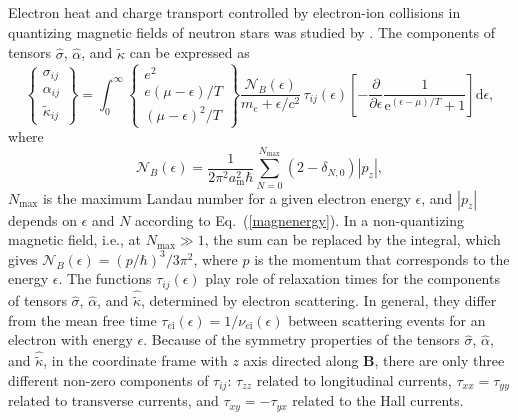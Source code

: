 \documentclass[smallextended]{svjour3}       %
\newcommand{\Ne}{\mathcal{N}_B(\epsilon)}
\newcommand{\req}[1]{Eq.~(\ref{#1})}
\begin{document}
Electron heat and charge transport controlled by electron-ion collisions in quantizing
magnetic fields of neutron stars was studied by
\citet{KaminkerYakovlev81,Yakovlev84,Hernquist84,P96,P99}.
The components of tensors $\hat{\sigma}$, $\hat{\alpha}$, and
$\hat{\tilde\kappa}$ can
be expressed as \citep{P99}
\begin{equation}
\left\{
   \begin{array}{c}
       \sigma_{ij} \\ \alpha_{ij} \\ \tilde\kappa_{ij}
   \end{array}
   \right\}
  =
     \int_{0}^\infty \left\{
   \begin{array}{c}
       e^2 \\ e {(\mu - \epsilon)/ T} \\ {(\mu - \epsilon)^2/ T}
   \end{array}
   \right\}
   \frac{\Ne}{m_e+\epsilon/c^2} \,\tau_{ij}(\epsilon)
   \left[ -\frac{\partial}{\partial\epsilon}
        \frac{1}{\mathrm{e}^{(\epsilon-\mu)/T}+1} \right]
      \mathrm{d}\epsilon,
\label{sigma-tau}
\end{equation}
where
\begin{equation}
    \Ne = \frac{1}{ 2 \pi^2 a_\mathrm{m}^2 \hbar}
            \sum_{N=0}^{N_\mathrm{max}} (2-\delta_{N,0})|p_z|,
\label{N_e}
\end{equation}
$N_\mathrm{max}$ is the maximum Landau number for a
given electron energy $\epsilon$, 
and $|p_z|$ depends
on $\epsilon$ and $N$ according to \req{magnenergy}.
In a non-quantizing magnetic field, i.e., at
$N_\mathrm{max}\gg1$, the sum can be replaced by the
integral, which gives $\Ne=(p/\hbar)^3/3\pi^2$, where $p$ is
the momentum that corresponds to the energy $\epsilon$.
The functions $\tau_{ij}(\epsilon)$
play role of relaxation times for the components of 
tensors $\hat{\sigma}$, $\hat{\alpha}$, and $\hat{\tilde\kappa}$,
determined by electron scattering.
In general, they differ from the mean free time
$\tau_{e\mathrm{i}}(\epsilon)=1/\nu_{e\mathrm{i}}(\epsilon)$
between scattering events for an electron with energy
$\epsilon$.
Because of the symmetry properties of
the tensors $\hat{\sigma}$, $\hat{\alpha}$, and
$\hat{\tilde\kappa}$, in the
coordinate frame with $z$ axis directed along $\bm{B}$,
there are only three different
non-zero components of $\tau_{ij}$:
$\tau_{zz}$ related to longitudinal currents,
$\tau_{xx}=\tau_{yy}$
 related to transverse currents,
and $\tau_{xy}=-\tau_{yx}$ related to the Hall
currents.
\end{document}
